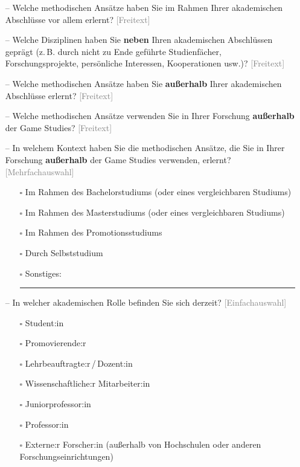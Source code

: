 \documentclass{scrartcl}
\begin{document}
\begin{itemize}
   \item[--] Welche methodischen Ansätze haben Sie im Rahmen Ihrer akademischen Abschlüsse vor allem erlernt? \textcolor{gray}{\textsf{[Freitext]}}
   \item[--] Welche Disziplinen haben Sie \textbf{neben} Ihren akademischen Abschlüssen geprägt (z.\,B. durch nicht zu Ende geführte Studienfächer, Forschungsprojekte, persönliche Interessen, Kooperationen usw.)? \textcolor{gray}{\textsf{[Freitext]}}
   \item[--] Welche methodischen Ansätze haben Sie \textbf{außerhalb} Ihrer akademischen Abschlüsse erlernt? \textcolor{gray}{\textsf{[Freitext]}}
   \item[--] Welche methodischen Ansätze verwenden Sie in Ihrer Forschung \textbf{außerhalb} der Game Studies? \textcolor{gray}{\textsf{[Freitext]}}
   \item[--] In welchem Kontext haben Sie die methodischen Ansätze, die Sie in Ihrer Forschung \textbf{außerhalb} der Game Studies verwenden, erlernt? \textcolor{gray}{\textsf{[Mehrfachauswahl]}}
   \begin{itemize}
      \item[$\square$] Im Rahmen des Bachelorstudiums (oder eines vergleichbaren Studiums)
      \item[$\square$] Im Rahmen des Masterstudiums (oder eines vergleichbaren Studiums)
      \item[$\square$] Im Rahmen des Promotionsstudiums
      \item[$\square$] Durch Selbststudium
      \item[$\square$] Sonstiges:\ \rule{2cm}{0.4pt}
   \end{itemize}
   \item[--] In welcher akademischen Rolle befinden Sie sich derzeit? \textcolor{gray}{\textsf{[Einfachauswahl]}}
   \begin{itemize}
      \item[$\square$] Student:in
      \item[$\square$] Promovierende:r
      \item[$\square$] Lehrbeauftragte:r\,/\,Dozent:in
      \item[$\square$] Wissenschaftliche:r Mitarbeiter:in
      \item[$\square$] Juniorprofessor:in
      \item[$\square$] Professor:in
      \item[$\square$] Externe:r Forscher:in (außerhalb von Hochschulen oder anderen Forschungseinrichtungen)

\end{itemize}
\end{itemize}
\end{document}
